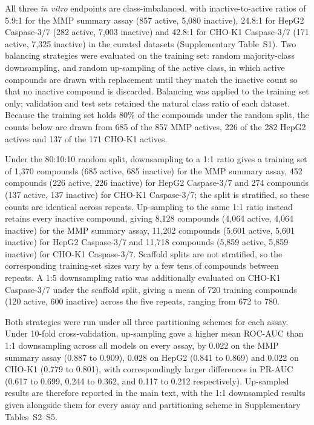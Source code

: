 \documentclass[letterpaper]{article}
\begin{document}
All three \emph{in vitro} endpoints are class-imbalanced, with
inactive-to-active ratios of 5.9:1 for the MMP summary assay (857 active,
5,080 inactive), 24.8:1 for HepG2 Caspase-3/7 (282 active, 7,003 inactive)
and 42.8:1 for CHO-K1 Caspase-3/7 (171 active, 7,325 inactive) in the
curated datasets (Supplementary Table~S1). Two balancing strategies were
evaluated on the training set: random majority-class downsampling, and
random up-sampling of the active class, in which active compounds are drawn
with replacement until they match the inactive count so that no inactive
compound is discarded. Balancing was applied to the training set only;
validation and test sets retained the natural class ratio of each dataset.
Because the training set holds 80\% of the compounds under the random split,
the counts below are drawn from 685 of the 857 MMP actives, 226 of the 282
HepG2 actives and 137 of the 171 CHO-K1 actives.

Under the 80:10:10 random split, downsampling to a 1:1 ratio gives a
training set of 1,370 compounds (685 active, 685 inactive) for the MMP
summary assay, 452 compounds (226 active, 226 inactive) for HepG2
Caspase-3/7 and 274 compounds (137 active, 137 inactive) for CHO-K1
Caspase-3/7; the split is stratified, so these counts are identical across
repeats. Up-sampling to the same 1:1 ratio instead retains every inactive
compound, giving 8,128 compounds (4,064 active, 4,064 inactive) for the MMP
summary assay, 11,202 compounds (5,601 active, 5,601 inactive) for HepG2
Caspase-3/7 and 11,718 compounds (5,859 active, 5,859 inactive) for CHO-K1
Caspase-3/7. Scaffold splits are not stratified, so the corresponding
training-set sizes vary by a few tens of compounds between repeats. A 1:5
downsampling ratio was additionally evaluated on CHO-K1 Caspase-3/7 under
the scaffold split, giving a mean of 720 training compounds (120 active, 600
inactive) across the five repeats, ranging from 672 to 780.

Both strategies were run under all three partitioning schemes for each
assay. Under 10-fold cross-validation, up-sampling gave a higher mean
ROC-AUC than 1:1 downsampling across all models on every assay, by 0.022 on
the MMP summary assay (0.887 to 0.909), 0.028 on HepG2 (0.841 to 0.869) and
0.022 on CHO-K1 (0.779 to 0.801), with correspondingly larger differences in
PR-AUC (0.617 to 0.699, 0.244 to 0.362, and 0.117 to 0.212 respectively).
Up-sampled results are therefore reported in the main text, with the 1:1
downsampled results given alongside them for every assay and partitioning
scheme in Supplementary Tables~S2--S5.
\end{document}
